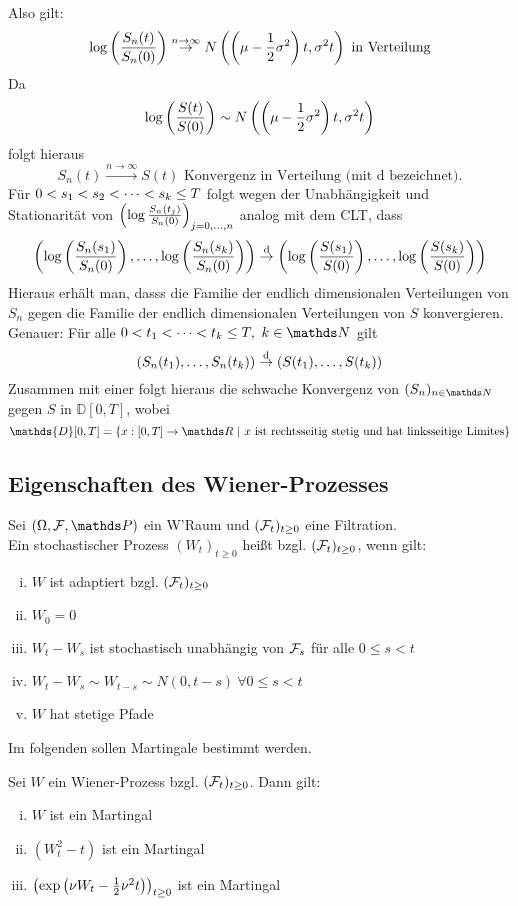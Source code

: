Also gilt:
\[
\log\left( \frac{S_n(t)}{S_n(0)}\right)\stackrel{n\to\infty}{\to} N\left( \left( \mu-\frac{1}{2}\sigma^2\right)t,\sigma^2t\right)\text{ in Verteilung}
\]
Da 
\[
\log\left( \frac{S(t)}{S(0)}\right)\sim N\left( \left( \mu-\frac{1}{2}\sigma^2\right)t,\sigma^2t\right)
\]
folgt hieraus
\[
S_n(t)\stackrel{n\to\infty}{\to}S(t)\text{ Konvergenz in Verteilung (mit d bezeichnet).}
\]
Für $0<s_1<s_2< \dots <s_k\le T$ folgt wegen der Unabhängigkeit und Stationarität von $\left( \log\frac{S_n(t_j)}{S_n(0)}\right)_{j=0, \dots ,n}$ analog mit dem CLT, dass
\[
\left( \log\left( \frac{S_n(s_1)}{S_n(0)}\right), \dots ,\log\left( \frac{S_n(s_k)}{S_n(0)}\right)\right)\stackrel{\text{d}}{\to}\left( \log\left( \frac{S(s_1)}{S(0)}\right), \dots ,\log\left( \frac{S(s_k)}{S(0)}\right)\right)
\]
Hieraus erhält man, dasss die Familie der endlich dimensionalen Verteilungen von $S_n$ gegen die Familie der endlich dimensionalen Verteilungen von $S$ konvergieren.
Genauer: Für alle $0<t_1\dt{<}t_k\le T,~k\in \N$ gilt
\[
\left( S_n(t_1), \dots ,S_n(t_k)\right)\stackrel{\text{d}}{\to}\left( S(t_1), \dots ,S(t_k)\right)
\]
Zusammen mit einer  folgt hieraus die schwache Konvergenz von $(S_n)_{n\in \N}$ gegen $S$ in $\mathds{D}[0,T]$, wobei
\[
\mathds{D}[0,T]=\penbrace{x:[0,T]\to\R~|~x \text{ ist rechtsseitig stetig und hat linksseitige Limites}}
\]

\subsection{Eigenschaften des Wiener-Prozesses}
\label{sub:eig_weiner-prozess}
Sei $(\Omega,\F,\Pw)$ ein W'Raum und $(\mathcal{F}_t)_{t\ge0}$ eine Filtration.\\
Ein stochastischer Prozess $(W_t)_{t\ge0}$ heißt  bzgl. $(\mathcal{F}_t)_{t\ge0}$, wenn gilt:
\begin{enumerate}[(i)]
	\item $W$ ist adaptiert bzgl. $(\mathcal{F}_t)_{t\ge0}$
	\item $W_0=0$ \Pfs
	\item $W_t-W_s$ ist stochastisch unabhängig von $\mathcal{F}_s$ für alle $0\le s<t$
	\item $W_t-W_s\sim W_{t-s}\sim N(0,t-s)~\forall 0\le s<t$
	\item $W$ hat \Pfs stetige Pfade
\end{enumerate}
Im folgenden sollen Martingale bestimmt werden.

Sei $W$ ein Wiener-Prozess bzgl. $(\mathcal{F}_t)_{t\ge0}$.
Dann gilt:
\begin{enumerate}[(i)]
	\item $W$ ist ein Martingal
	\item $(W_t^2-t)$ ist ein Martingal
	\item $\left( \exp\left( \nu W_t-\frac{1}{2}\nu^2 t\right)\right)_{t\ge 0}$ ist ein Martingal
\end{enumerate}

